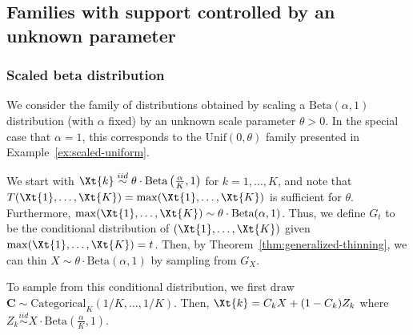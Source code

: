 \documentclass[12pt]{article}
\begin{document}
\subsection{Families with support controlled by an unknown parameter}

\subsubsection{Scaled beta distribution}
\label{subsec:scaled-beta-proofs}

We consider the family of distributions obtained by scaling a $\text{Beta}(\alpha,1)$ distribution (with $\alpha$ fixed) by an unknown scale parameter $\theta>0$.  In the special case that $\alpha=1$, this corresponds to the $\text{Unif}(0,\theta)$ family presented in Example~\ref{ex:scaled-uniform}.

\begin{exmp} \label{ex:scaled-beta}
We start with  $\Xt{k} \overset{iid}{\sim} \theta\cdot\text{Beta}\left(\frac{\alpha}{K},1\right)$ for $k=1,\ldots,K$, and note that $T(\Xt{1},\dots,\Xt{K}) = \max(\Xt{1},\dots,\Xt{K})$ is sufficient for $\theta$. 
 Furthermore, $\max(\Xt{1},\dots,\Xt{K}) \sim \theta\cdot\text{Beta}(\alpha, 1)$. Thus, we define $G_t$ to be the conditional distribution of 
 $(\Xt{1},\dots,\Xt{K})$ given $\max(\Xt{1},\dots,\Xt{K}) = t$. Then, 
 by Theorem~\ref{thm:generalized-thinning}, 
 we can thin  $X \sim \theta\cdot\text{Beta}(\alpha,1)$ by 
 sampling from  $G_X$. 


To sample from this conditional distribution, we first   
draw $\mathbf{C}\sim\text{Categorical}_K\left(1/K, \ldots, 1/K\right)$. Then, $\Xt{k} = C_kX+(1-C_k)Z_k$ where $Z_k \overset{iid}{\sim} X\cdot\text{Beta}\left(\frac{\alpha}{K},1\right)$.
\end{exmp}
\end{document}
